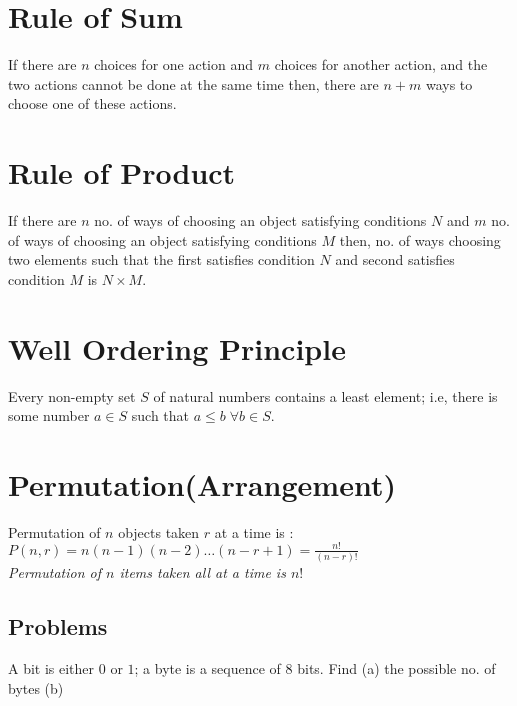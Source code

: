 \documentclass[12pt,landscape]{article}
\begin{document}
\begin{multicols*}{2}
  \section{Rule of Sum}
  If there are $n$ choices for one action and $m$ choices for another action, and the two actions cannot be done at the same time then, there are $n+m$ ways to choose one of these actions.
  \section{Rule of Product}
  If there are $n$ no. of ways of choosing an object satisfying conditions $N$ and $m$ no. of ways of choosing an object satisfying conditions $M$ then, no. of ways choosing two elements such that the first satisfies condition $N$ and second satisfies condition $M$ is $N\times M$.
  \section{Well Ordering Principle}
  Every non-empty set $S$ of natural numbers contains a least element; i.e, there is some number $a\in S$ such that $a\leq b \; \forall b\in S$.
  
  \section{Permutation(Arrangement)}
  Permutation of $n$ objects taken $r$ at a time is :\\ 
  $P(n,r) = n(n-1)(n-2)\dots(n-r+1) = \frac{n!}{(n-r)!}$\\
  \textit{Permutation of $n$ items taken all at a time is $n!$}
  \subsection*{Problems}
  A bit is either $0$ or $1$; a byte is a sequence of $8$ bits. Find (a) the possible no. of bytes (b) 
\end{multicols*}
\end{document}
